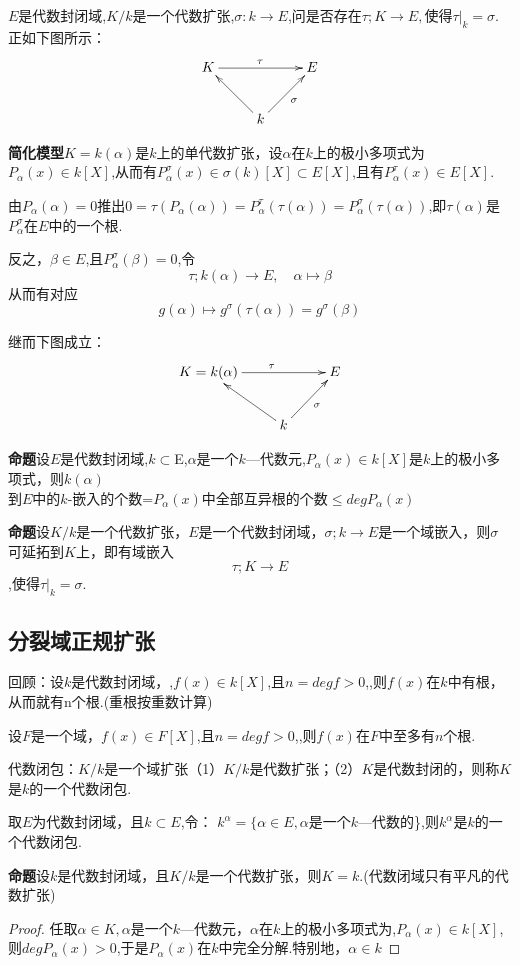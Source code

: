 \documentclass[UTF8]{article}
\begin{document}
$E$是代数封闭域,$K/k$是一个代数扩张,$\sigma : k\rightarrow E$,问是否存在$\tau ; K\rightarrow E,$使得$\tau |_k=\sigma$.正如下图所示：
$$\xymatrix{K\ar[rr]^{\tau}&&{E}\\& k\ar[lu] \ar[ru]_{\sigma} & }$$

\textbf{简化模型}\quad $K=k(\alpha)$是$k$上的单代数扩张，设$\alpha$在$k$上的极小多项式为$P_{\alpha}(x)\in k[X]$,从而有$P_{\alpha}^{\sigma }(x)\in \sigma(k)[X]\subset E[X]$,且有$P_{\alpha}^{\tau}(x)\in E[X].$ 

由$P_{\alpha}(\alpha)=0$推出$0=\tau(P_{\alpha}(\alpha))= P_{\alpha}^{\tau}(\tau(\alpha))=P_{\alpha}^{\sigma }(\tau(\alpha))$,即$\tau(\alpha)$是$P_{\alpha}^{\sigma }$在$E$中的一个根.

反之，$\beta\in E$,且$P_{\alpha}^{\sigma }(\beta)=0$,令$$\tau ; k(\alpha)\rightarrow E,\quad \alpha\longmapsto \beta$$从而有对应$$g(\alpha)\longmapsto g^{\sigma }(\tau(\alpha))= g^{\sigma }(\beta)$$

继而下图成立：
$$\xymatrix{K=k(\alpha)\ar[rr]^{\tau}&&{E}\\& k\ar[lu] \ar[ru]_{\sigma} & }$$

\textbf{命题}\quad 设$E$是代数封闭域,$k\subset $E,$\alpha$是一个$k$—代数元,$P_{\alpha}(x)\in k[X]$是$k$上的极小多项式，则$k(\alpha)$\\到$E$中的$k$-嵌入的个数=$P_{\alpha}(x)$中全部互异根的个数$\le degP_{\alpha}(x)$

\textbf{命题}\quad  设$K/k$是一个代数扩张，$E$是一个代数封闭域，$\sigma; k\rightarrow E$是一个域嵌入，则$\sigma$可延拓到$K$上，即有域嵌入$$\tau ;K\rightarrow E$$,使得$\tau |_k=\sigma$.

\subsection{分裂域\quad 正规扩张}
\normalsize

回顾：设$k$是代数封闭域，,$f(x)\in k[X]$,且$n=degf>0$,,则$f(x)$在$k$中有根，从而就有n个根.(重根按重数计算)

设$F$是一个域，$f(x)\in F[X]$,且$n=degf>0$,,则$f(x)$在$F$中至多有$n$个根.


代数闭包：$K/k$是一个域扩张（1）$K/k$是代数扩张；（2）$K$是代数封闭的，则称$K$是$k$的一个代数闭包.

取$E$为代数封闭域，且$k\subset E$,令：
$k^{\alpha}=\{\alpha \in E,\alpha$是一个$k$—代数的\},则$k^{\alpha}$是$k$的一个代数闭包.

\textbf{命题}\quad 设$k$是代数封闭域，且$K/k$是一个代数扩张，则$K=k$.(代数闭域只有平凡的代数扩张)
\begin{proof}
任取$\alpha \in K,\alpha$是一个$k$—代数元，$\alpha $在$k$上的极小多项式为,$P_{\alpha}(x)\in k[X]$,则$degP_{\alpha}(x)>0$,于是$P_{\alpha}(x)$在$k$中完全分解.特别地，$\alpha \in k$
\end{proof}
\end{document}
